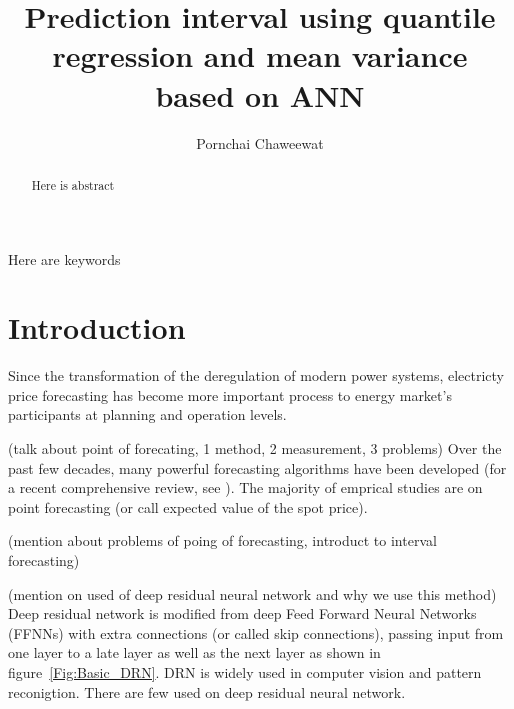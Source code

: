 \documentclass[review]{elsarticle}
\begin{document}
\begin{frontmatter}

\title{Prediction interval using quantile regression and mean variance based on ANN}

\author{Pornchai Chaweewat}

\address{AIT}

%
%

\begin{abstract}
Here is abstract
\end{abstract}

\begin{keyword}
Here are keywords
\end{keyword}

\end{frontmatter}

\linenumbers

\section{Introduction}

  Since the transformation of the deregulation of modern power systems, electricty price forecasting has become more important process to energy market's participants at planning and operation levels.

  (talk about point of forecating, 1 method, 2 measurement, 3 problems) Over the past few decades, many powerful forecasting algorithms have been developed (for a recent comprehensive review, see \cite{Weron2014}). The majority of emprical studies are on point forecasting (or call expected value of the spot price).

  (mention about problems of poing of forecasting, introduct to interval forecasting)

  (mention on used of deep residual neural network and why we use this method)
  Deep residual network is modified from deep Feed Forward Neural Networks (FFNNs) with extra connections (or called skip connections), passing input from one layer to a late layer as well as the next layer as shown in figure~\ref{Fig:Basic_DRN}. DRN is widely used in computer vision and pattern reconigtion. There are few used on deep residual neural network.
\end{document}

